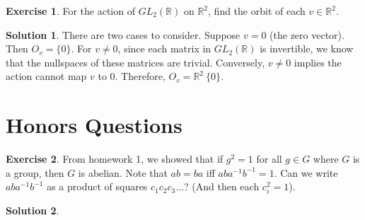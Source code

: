 \documentclass[12pt]{article}
\theoremstyle{definition}
\newcommand{\R}{\mathbb{R}}
\newtheorem{exercise}{\color{YellowOrange}Exercise}
\theoremstyle{definition}
\newtheorem{solution}{\color{Goldenrod}Solution}
\begin{document}
\begin{exercise}
For the action of $GL_2(\mathbb{R})$ on $\R^2$, find the orbit of each $v \in \R^2$. 
\end{exercise}
\begin{solution}
There are two cases to consider. Suppose $v = 0$ (the zero vector). Then $O_v = \{0\}$. For $v \neq 0$, since each matrix in $GL_2(\mathbb{R})$ is invertible, we know that the nullspaces of these matrices are trivial. Conversely, $v\neq 0$ implies the action cannot map $v$ to 0. Therefore, $O_v = \R^2 \ \{0 \}$. 
\end{solution}

\section{Honors Questions}
\begin{exercise}
From homework 1, we showed that if $g^2 = 1$ for all $g \in G$ where $G$ is a group, then $G$ is abelian. Note that $ab = ba$ iff $aba^{-1}b^{-1} = 1$. Can we write $aba^{-1}b^{-1}$ as a product of squares $c_1 c_2 c_3 \ldots $? (And then each $c^2_i = 1$).
\end{exercise}
\begin{solution}

\end{solution}
\end{document}
